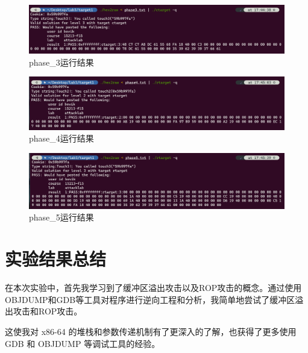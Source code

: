 \documentclass{article}
\begin{document}
\begin{figure}[H]
  \centering
  \includegraphics[width=17cm]{phase3.png}
  \caption{phase\_3运行结果}
\end{figure}

\begin{figure}[H]
  \centering
  \includegraphics[width=17cm]{phase4.png}
  \caption{phase\_4运行结果}
\end{figure}

\begin{figure}[H]
  \centering
  \includegraphics[width=17cm]{phase5.png}
  \caption{phase\_5运行结果}
\end{figure}

\normalsize
\section{实验结果总结}
\large
在本次实验中，首先我学习到了缓冲区溢出攻击以及ROP攻击的概念。通过使用OBJDUMP和GDB等工具对程序进行逆向工程和分析，我简单地尝试了缓冲区溢出攻击和ROP攻击。

这使我对 x86-64 的堆栈和参数传递机制有了更深入的了解，也获得了更多使用 GDB 和 OBJDUMP 等调试工具的经验。

\normalsize
\large




\normalsize
\end{document}
